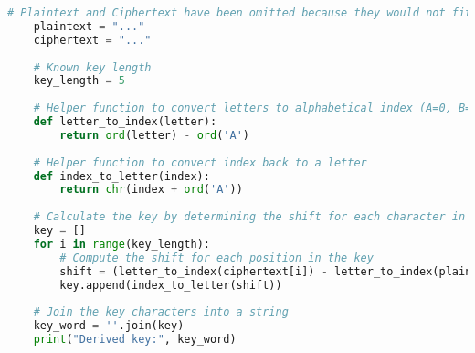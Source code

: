 \vspace*{-0.5cm}
\begin{lstlisting}[language=Python, caption=Python Code to Find Key, label={lst:5.2}]
    # Plaintext and Ciphertext have been omitted because they would not fit in the page.
    plaintext = "..."
    ciphertext = "..."
    
    # Known key length
    key_length = 5
    
    # Helper function to convert letters to alphabetical index (A=0, B=1, ..., Z=25)
    def letter_to_index(letter):
        return ord(letter) - ord('A')
    
    # Helper function to convert index back to a letter
    def index_to_letter(index):
        return chr(index + ord('A'))
    
    # Calculate the key by determining the shift for each character in the key
    key = []
    for i in range(key_length):
        # Compute the shift for each position in the key
        shift = (letter_to_index(ciphertext[i]) - letter_to_index(plaintext[i])) % 26
        key.append(index_to_letter(shift))
    
    # Join the key characters into a string
    key_word = ''.join(key)
    print("Derived key:", key_word)
    
\end{lstlisting}